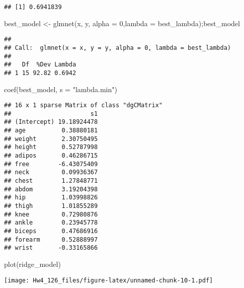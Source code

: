 \documentclass[
]{article}
\newenvironment{Shaded}{\begin{snugshade}}{\end{snugshade}}
\newcommand{\AttributeTok}[1]{\textcolor[rgb]{0.77,0.63,0.00}{#1}}
\newcommand{\DecValTok}[1]{\textcolor[rgb]{0.00,0.00,0.81}{#1}}
\newcommand{\FunctionTok}[1]{\textcolor[rgb]{0.00,0.00,0.00}{#1}}
\newcommand{\NormalTok}[1]{#1}
\newcommand{\OtherTok}[1]{\textcolor[rgb]{0.56,0.35,0.01}{#1}}
\newcommand{\StringTok}[1]{\textcolor[rgb]{0.31,0.60,0.02}{#1}}
\begin{document}
\begin{verbatim}
## [1] 0.6941839
\end{verbatim}

\begin{Shaded}
\begin{Highlighting}[]
\NormalTok{best\_model }\OtherTok{\textless{}{-}} \FunctionTok{glmnet}\NormalTok{(x, y, }\AttributeTok{alpha =} \DecValTok{0}\NormalTok{,}\AttributeTok{lambda =}\NormalTok{ best\_lambda);best\_model}
\end{Highlighting}
\end{Shaded}

\begin{verbatim}
## 
## Call:  glmnet(x = x, y = y, alpha = 0, lambda = best_lambda) 
## 
##   Df  %Dev Lambda
## 1 15 92.82 0.6942
\end{verbatim}

\begin{Shaded}
\begin{Highlighting}[]
\FunctionTok{coef}\NormalTok{(best\_model, }\AttributeTok{s =} \StringTok{"lambda.min"}\NormalTok{)}
\end{Highlighting}
\end{Shaded}

\begin{verbatim}
## 16 x 1 sparse Matrix of class "dgCMatrix"
##                      s1
## (Intercept) 19.18924478
## age          0.38880181
## weight       2.30750495
## height       0.52787998
## adipos       0.46286715
## free        -6.43075409
## neck         0.09936367
## chest        1.27848771
## abdom        3.19204398
## hip          1.03998826
## thigh        1.01855289
## knee         0.72980876
## ankle        0.23945778
## biceps       0.47686916
## forearm      0.52888997
## wrist       -0.33165866
\end{verbatim}

\begin{Shaded}
\begin{Highlighting}[]
\FunctionTok{plot}\NormalTok{(ridge\_model)}
\end{Highlighting}
\end{Shaded}

\texttt{[image: Hw4\_126\_files/figure-latex/unnamed-chunk-10-1.pdf]}
\end{document}
